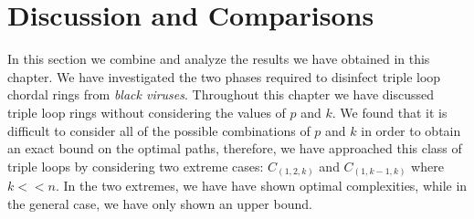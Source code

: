 \section{Discussion and Comparisons}  
In this section we combine and analyze  the  results we have obtained in this chapter. We have investigated the two phases required to disinfect triple loop chordal rings from {\it black viruses}. Throughout this chapter we have discussed triple loop rings without considering the values of  $p$ and $k$. We found that it is difficult to consider all of the possible combinations of $p$ and $k$ in order to obtain an exact bound on the  optimal paths, therefore, we have approached this class of triple loops by considering two extreme cases: $C_(1,2,k)$ and $C_(1,k-1,k)$ where $k<<n$. In the two extremes, we have have shown optimal complexities, while in the general case, we have only shown an upper bound.



% 
% 



